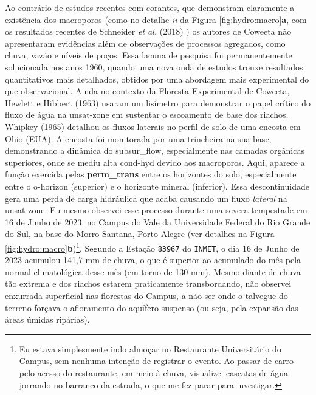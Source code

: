 \documentclass[./main.tex]{subfiles}
\begin{document}
\par Ao contrário de estudos recentes com corantes, que demonstram claramente a existência dos macroporos (como no detalhe \textit{ii} da Figura \ref{fig:hydro:macro}\textbf{a}, com os resultados recentes de Schneider \textit{et al.} (2018) \cite{Schneider2018}) os autores de Coweeta não apresentaram evidências além de observações de processos agregados, como chuva, vazão e níveis de poços. Essa lacuna de pesquisa foi permanentemente solucionada nos anos 1960, quando uma nova onda de estudos trouxe resultados quantitativos mais detalhados, obtidos por uma abordagem mais experimental do que observacional. Ainda no contexto da Floresta Experimental de Coweeta, Hewlett e Hibbert (1963) \cite{Hewlett1963} usaram um lisímetro para demonstrar o papel crítico do fluxo de água na \gls{unsat-zone} em sustentar o escoamento de base dos riachos. Whipkey (1965) \cite{Whipkey1965} detalhou os fluxos laterais no perfil de solo de uma encosta em Ohio (EUA). A encosta foi monitorada por uma trincheira na sua base, demonstrando a dinâmica do \gls{subsur_flow}, especialmente nas camadas orgânicas superiores, onde se mediu alta \gls{cond-hyd} devido aos macroporos. Aqui, aparece a função exercida pelas \textbf{\gls{perm_trans}} entre os horizontes do solo, especialmente entre o \gls{o-horizon} (superior) e o horizonte mineral (inferior). Essa descontinuidade gera uma perda de carga hidráulica que acaba causando um fluxo \textit{lateral} na \gls{unsat-zone}. Eu mesmo observei esse processo durante uma severa tempestade em 16 de Junho de 2023, no Campus do Vale da Universidade Federal do Rio Grande do Sul, na base do Morro Santana, Porto Alegre (ver detalhes na Figura \ref{fig:hydro:macro}\textbf{b})\footnote{Eu estava simplesmente indo almoçar no Restaurante Universitário do Campus, sem nenhuma intenção de registrar o evento. Ao passar de carro pelo acesso do restaurante, em meio à chuva, visualizei cascatas de água jorrando no barranco da estrada, o que me fez parar para investigar.}. Segundo a Estação \texttt{83967} do \texttt{INMET}, o dia 16 de Junho de 2023 acumulou 141,7 mm de chuva, o que é superior ao acumulado do mês pela normal climatológica desse mês (em torno de 130 mm). Mesmo diante de chuva tão extrema e dos riachos estarem praticamente transbordando, não observei enxurrada superficial nas florestas do Campus, a não ser onde o talvegue do terreno forçava o afloramento do aquífero suspenso (ou seja, pela expansão das áreas úmidas ripárias).
\end{document}
